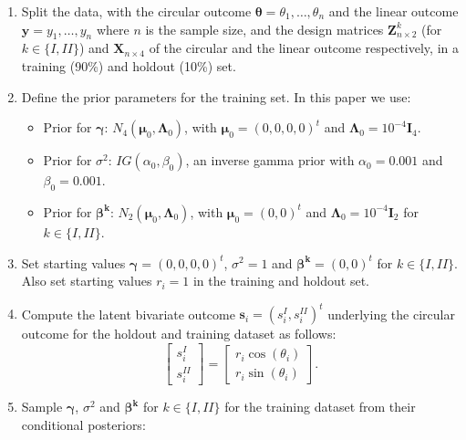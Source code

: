 \documentclass[12pt,]{article}
\begin{document}
\begin{enumerate}
\item Split the data, with the circular outcome $\boldsymbol{\theta} = \theta_1, \dots, \theta_n$ and the linear outcome $\boldsymbol{y} = y_1, \dots, y_n$ where $n$ is the sample size, and the design matrices $\boldsymbol{Z}^k_{n \times 2}$ (for $k \in \{I,II\}$) and $\boldsymbol{X}_{n \times 4}$ of the circular and the linear outcome respectively, in a training (90\%) and holdout (10\%) set. 
\item Define the prior parameters for the training set. In this paper we use:

\begin{itemize}
\item Prior for $\boldsymbol{\gamma}$: $N_4(\boldsymbol{\mu}_{0}, \boldsymbol{\Lambda}_{0})$, with  $\boldsymbol{\mu}_{0} = (0,0,0,0)^t$ and  $\boldsymbol{\Lambda}_{0} = 10^{-4}\boldsymbol{I}_4$.
\item Prior for $\sigma^2$: $IG(\alpha_{0}, \beta_{0})$, an inverse gamma prior with $\alpha_{0} = 0.001$ and  $\beta_{0} = 0.001$.
\item Prior for $\boldsymbol{\beta^{k}}$: $N_2(\boldsymbol{\mu}_{0}, \boldsymbol{\Lambda}_{0})$, with $\boldsymbol{\mu}_{0} = (0,0)^t$ and  $\boldsymbol{\Lambda}_{0} = 10^{-4}\boldsymbol{I}_2$ for $k \in \{I,II\}$.
\end{itemize}

\item Set starting values $\boldsymbol{\gamma} = (0,0,0,0)^t$, $\sigma^2 = 1$ and $\boldsymbol{\beta^{k}} = (0,0)^t$ for $k \in \{I,II\}$. Also set starting values $r_i = 1$ in the training and holdout set. 
\item Compute the latent bivariate outcome $\boldsymbol{s}_i = (s_i^{I}, s_i^{II})^t$ underlying the circular outcome for the holdout and training dataset as follows:
$$\begin{bmatrix} s^{I}_{i} \\ s^{II}_{i} \end{bmatrix} = \begin{bmatrix} r_i \cos (\theta_i)\\  r_i\sin (\theta_i)\end{bmatrix}.$$
\item Sample $\boldsymbol{\gamma}$, $\sigma^2$ and $\boldsymbol{\beta^{k}}$ for $k \in \{I,II\}$ for the training dataset from their conditional posteriors:


\end{enumerate}
\end{document}

